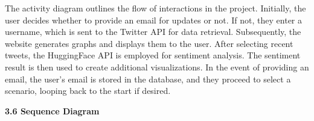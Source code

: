 \documentclass[a4paper,12pt]{article}
\begin{document}
{{{  The activity diagram outlines the flow of interactions in the project. Initially, the user decides whether to provide an email for updates or not. If not, they enter a username, which is sent to the Twitter API for data retrieval. Subsequently, the website generates graphs and displays them to the user. After selecting recent tweets, the HuggingFace API is employed for sentiment analysis. The sentiment result is then used to create additional visualizations. In the event of providing an email, the user's email is stored in the database, and they proceed to select a scenario, looping back to the start if desired.


  \newpage
		\begin{flushleft}
			\fontsize{13}{15}\selectfont\textbf{3.6 Sequence Diagram}
			\label{sequence}
		\end{flushleft}
								
}}}
\end{document}
